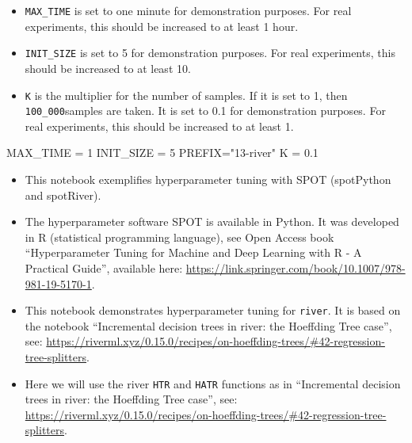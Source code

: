 \documentclass[
  letterpaper,
  DIV=11,
  numbers=noendperiod]{scrreprt}
\newenvironment{Shaded}{\begin{snugshade}}{\end{snugshade}}
\newcommand{\DecValTok}[1]{\textcolor[rgb]{0.68,0.00,0.00}{#1}}
\newcommand{\FloatTok}[1]{\textcolor[rgb]{0.68,0.00,0.00}{#1}}
\newcommand{\NormalTok}[1]{\textcolor[rgb]{0.00,0.23,0.31}{#1}}
\newcommand{\OperatorTok}[1]{\textcolor[rgb]{0.37,0.37,0.37}{#1}}
\newcommand{\StringTok}[1]{\textcolor[rgb]{0.13,0.47,0.30}{#1}}
\providecommand{\tightlist}{%
  \setlength{\itemsep}{0pt}\setlength{\parskip}{0pt}}\usepackage{longtable,booktabs,array}
\begin{document}
\begin{tcolorbox}[enhanced jigsaw, left=2mm, toprule=.15mm, colframe=quarto-callout-caution-color-frame, leftrule=.75mm, title=\textcolor{quarto-callout-caution-color}{\faFire}\hspace{0.5em}{Caution: Run time and initial design size should be increased for real
experiments}, toptitle=1mm, opacitybacktitle=0.6, arc=.35mm, titlerule=0mm, opacityback=0, bottomtitle=1mm, coltitle=black, rightrule=.15mm, colback=white, colbacktitle=quarto-callout-caution-color!10!white, breakable, bottomrule=.15mm]

\begin{itemize}
\tightlist
\item
  \texttt{MAX\_TIME} is set to one minute for demonstration purposes.
  For real experiments, this should be increased to at least 1 hour.
\item
  \texttt{INIT\_SIZE} is set to 5 for demonstration purposes. For real
  experiments, this should be increased to at least 10.
\item
  \texttt{K} is the multiplier for the number of samples. If it is set
  to 1, then \texttt{100\_000}samples are taken. It is set to 0.1 for
  demonstration purposes. For real experiments, this should be increased
  to at least 1.
\end{itemize}

\end{tcolorbox}

\begin{Shaded}
\begin{Highlighting}[]
\NormalTok{MAX\_TIME }\OperatorTok{=} \DecValTok{1}
\NormalTok{INIT\_SIZE }\OperatorTok{=} \DecValTok{5}
\NormalTok{PREFIX}\OperatorTok{=}\StringTok{"13{-}river"}
\NormalTok{K }\OperatorTok{=} \FloatTok{0.1}
\end{Highlighting}
\end{Shaded}

\begin{itemize}
\tightlist
\item
  This notebook exemplifies hyperparameter tuning with SPOT (spotPython
  and spotRiver).
\item
  The hyperparameter software SPOT is available in Python. It was
  developed in R (statistical programming language), see Open Access
  book ``Hyperparameter Tuning for Machine and Deep Learning with R - A
  Practical Guide'', available here:
  \url{https://link.springer.com/book/10.1007/978-981-19-5170-1}.
\item
  This notebook demonstrates hyperparameter tuning for \texttt{river}.
  It is based on the notebook ``Incremental decision trees in river: the
  Hoeffding Tree case'', see:
  \url{https://riverml.xyz/0.15.0/recipes/on-hoeffding-trees/\#42-regression-tree-splitters}.
\item
  Here we will use the river \texttt{HTR} and \texttt{HATR} functions as
  in ``Incremental decision trees in river: the Hoeffding Tree case'',
  see:
  \url{https://riverml.xyz/0.15.0/recipes/on-hoeffding-trees/\#42-regression-tree-splitters}.
\end{itemize}
\end{document}
